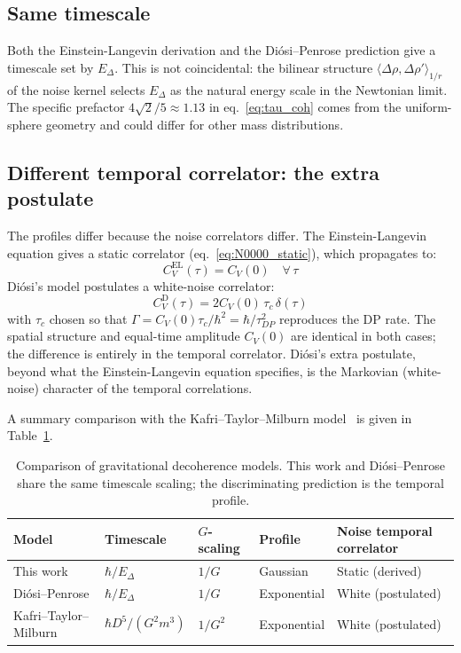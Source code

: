 \documentclass[12pt,a4paper]{article}
\begin{document}
\subsection{Same timescale}

Both the Einstein-Langevin derivation and the Di\'osi--Penrose prediction give a timescale
set by $E_\Delta$. This is not coincidental: the bilinear structure $\langle\Delta\rho,\Delta\rho'\rangle_{1/r}$
of the noise kernel selects $E_\Delta$ as the natural energy scale in the Newtonian limit. The specific prefactor
$4\sqrt{2}/5 \approx 1.13$ in eq.~\eqref{eq:tau_coh} comes from the uniform-sphere
geometry and could differ for other mass distributions.

\subsection{Different temporal correlator: the extra postulate}

The profiles differ because the noise correlators differ. The Einstein-Langevin equation
gives a static correlator (eq.~\ref{eq:N0000_static}), which propagates to:
\begin{equation}
C_V^{\text{EL}}(\tau) = C_V(0) \quad \forall\,\tau
\label{eq:corr_el}
\end{equation}
Di\'osi's model postulates a white-noise correlator:
\begin{equation}
C_V^{\text{D}}(\tau) = 2C_V(0)\,\tau_c\,\delta(\tau)
\label{eq:corr_diosi}
\end{equation}
with $\tau_c$ chosen so that $\Gamma = C_V(0)\tau_c/\hbar^2 = \hbar/\tau_{DP}^2$ reproduces
the DP rate. The spatial structure and equal-time amplitude $C_V(0)$ are identical in both
cases; the difference is entirely in the temporal correlator. Di\'osi's extra postulate,
beyond what the Einstein-Langevin equation specifies, is the Markovian (white-noise)
character of the temporal correlations.

A summary comparison with the Kafri--Taylor--Milburn model~\cite{kafri} is given in
Table~\ref{tab:models}.

\begin{table}[h]
\centering
\begin{tabular}{lllll}
\toprule
Model & Timescale & $G$-scaling & Profile & Noise temporal correlator \\
\midrule
This work & $\hbar/E_\Delta$ & $1/G$ & Gaussian & Static (derived) \\
Di\'osi--Penrose & $\hbar/E_\Delta$ & $1/G$ & Exponential & White (postulated) \\
Kafri--Taylor--Milburn & $\hbar D^5/(G^2 m^3)$ & $1/G^2$ & Exponential & White (postulated) \\
\bottomrule
\end{tabular}
\caption{Comparison of gravitational decoherence models. This work and Di\'osi--Penrose
share the same timescale scaling; the discriminating prediction is the temporal profile.}
\label{tab:models}
\end{table}
\end{document}
